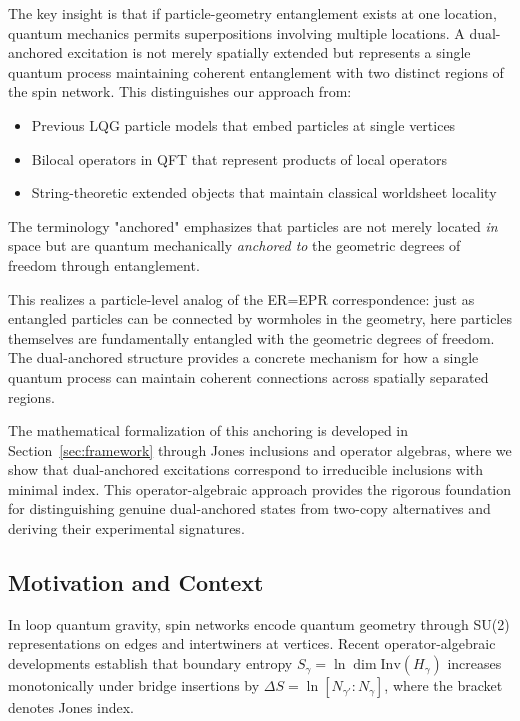 \documentclass[11pt]{article}
\newcommand{\Inv}{\mathrm{Inv}}
\theoremstyle{plain}
\theoremstyle{definition}
\begin{document}
The key insight is that if particle-geometry entanglement exists at one location, quantum mechanics permits superpositions involving multiple locations. A dual-anchored excitation is not merely spatially extended but represents a single quantum process maintaining coherent entanglement with two distinct regions of the spin network. This distinguishes our approach from:
\begin{itemize}
  \item Previous LQG particle models that embed particles at single vertices
  \item Bilocal operators in QFT that represent products of local operators
  \item String-theoretic extended objects that maintain classical worldsheet locality
\end{itemize}

The terminology "anchored" emphasizes that particles are not merely located \emph{in} space but are quantum mechanically \emph{anchored to} the geometric degrees of freedom through entanglement.

This realizes a particle-level analog of the ER=EPR correspondence: just as entangled particles can be connected by wormholes in the geometry, here particles themselves are fundamentally entangled with the geometric degrees of freedom. The dual-anchored structure provides a concrete mechanism for how a single quantum process can maintain coherent connections across spatially separated regions.

The mathematical formalization of this anchoring is developed in Section~\ref{sec:framework} through Jones inclusions and operator algebras, where we show that dual-anchored excitations correspond to irreducible inclusions with minimal index. This operator-algebraic approach provides the rigorous foundation for distinguishing genuine dual-anchored states from two-copy alternatives and deriving their experimental signatures.

\subsection{Motivation and Context}
In loop quantum gravity, spin networks encode quantum geometry through SU(2) representations on edges and intertwiners at vertices. Recent operator-algebraic developments \cite{bridge-monotonicity,operator-theory} establish that boundary entropy $S_\gamma = \ln\dim\Inv(H_\gamma)$ increases monotonically under bridge insertions by $\Delta S = \ln[N_{\gamma'}:N_\gamma]$, where the bracket denotes Jones index.
\end{document}
